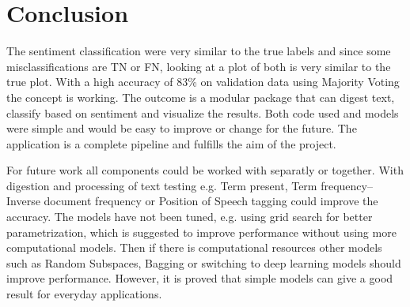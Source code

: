 \chapter{Conclusion}
\label{cha:conclusion}


The sentiment classification were very similar to the true labels and since some misclassifications are TN or FN, looking at a plot of both is very similar to the true plot. 
With a high accuracy of 83\% on validation data using Majority Voting the concept is working. 
The outcome is a modular package that can digest text, classify based on sentiment and visualize the results. 
Both code used and models were simple and would be easy to improve or change for the future. 
The application is a complete pipeline and fulfills the aim of the project.

For future work all components could be worked with separatly or together. 
With digestion and processing of text testing e.g. Term present, Term frequency–Inverse document frequency or Position of Speech tagging could improve the accuracy. 
The models have not been tuned, e.g. using grid search for better parametrization, which is suggested to improve performance without using more computational models. 
Then if there is computational resources other models such as Random Subspaces, Bagging or switching to deep learning models should improve performance. 
However, it is proved that simple models can give a good result for everyday applications.